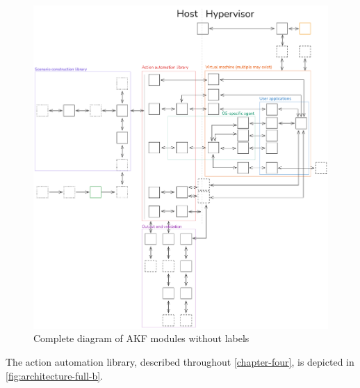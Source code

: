 \documentclass[letterpaper,12pt]{report}
\begin{document}
\begin{figure}[htbp]
\centering
\includegraphics[width=1\linewidth]{mini-architecture-full.png}
\caption{Complete diagram of AKF modules without
labels}\label{fig:mini-full}
\end{figure}

The action automation library, described throughout \autoref{chapter-four}, is depicted in \autoref{fig:architecture-full-b}.
\end{document}
